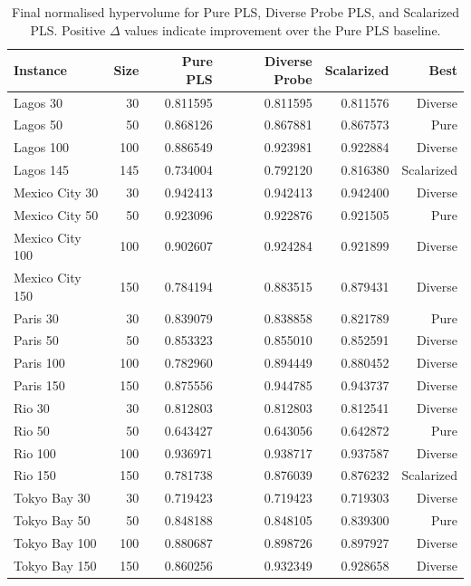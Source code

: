 \documentclass[11pt,a4paper]{article}
\begin{document}
\begin{table}[htbp]
\centering
\caption{Final normalised hypervolume for Pure PLS, Diverse Probe PLS,
and Scalarized PLS.  Positive \(\Delta\) values indicate improvement
over the Pure PLS baseline.}
\label{tab:results}
\begin{tabular}{lrrrrr}
\toprule
\textbf{Instance} & \textbf{Size} & \textbf{Pure PLS} &
\textbf{Diverse Probe} & \textbf{Scalarized} &
\textbf{Best} \\
\midrule
Lagos 30        &  30 & 0.811595 & 0.811595 & 0.811576 & Diverse \\
Lagos 50        &  50 & 0.868126 & 0.867881 & 0.867573 & Pure \\
Lagos 100       & 100 & 0.886549 & 0.923981 & 0.922884 & Diverse \\
Lagos 145       & 145 & 0.734004 & 0.792120 & 0.816380 & Scalarized \\
\midrule
Mexico City 30  &  30 & 0.942413 & 0.942413 & 0.942400 & Diverse \\
Mexico City 50  &  50 & 0.923096 & 0.922876 & 0.921505 & Pure \\
Mexico City 100 & 100 & 0.902607 & 0.924284 & 0.921899 & Diverse \\
Mexico City 150 & 150 & 0.784194 & 0.883515 & 0.879431 & Diverse \\
\midrule
Paris 30        &  30 & 0.839079 & 0.838858 & 0.821789 & Pure \\
Paris 50        &  50 & 0.853323 & 0.855010 & 0.852591 & Diverse \\
Paris 100       & 100 & 0.782960 & 0.894449 & 0.880452 & Diverse \\
Paris 150       & 150 & 0.875556 & 0.944785 & 0.943737 & Diverse \\
\midrule
Rio 30          &  30 & 0.812803 & 0.812803 & 0.812541 & Diverse \\
Rio 50          &  50 & 0.643427 & 0.643056 & 0.642872 & Pure \\
Rio 100         & 100 & 0.936971 & 0.938717 & 0.937587 & Diverse \\
Rio 150         & 150 & 0.781738 & 0.876039 & 0.876232 & Scalarized \\
\midrule
Tokyo Bay 30    &  30 & 0.719423 & 0.719423 & 0.719303 & Diverse \\
Tokyo Bay 50    &  50 & 0.848188 & 0.848105 & 0.839300 & Pure \\
Tokyo Bay 100   & 100 & 0.880687 & 0.898726 & 0.897927 & Diverse \\
Tokyo Bay 150   & 150 & 0.860256 & 0.932349 & 0.928658 & Diverse \\
\bottomrule
\end{tabular}
\end{table}
\end{document}
